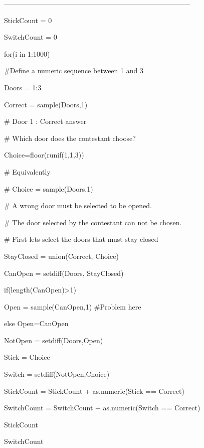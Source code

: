 \documentclass[a4paper,12pt]{article}
\begin{document}
--------------------------------------------------------------------------------





StickCount = 0

SwitchCount = 0


for(i in 1:1000)


{
	
	
	
	#Define a numeric sequence between 1 and 3
	
	
	Doors = 1:3 
	
	
	
	Correct = sample(Doors,1)
	
	
	
	
	
	# Door 1 :  Correct answer
	
	
	
	# Which door does the contestant choose?
	
	
	Choice=floor(runif(1,1,3))
	
	
	# Equivalently
	
	# Choice = sample(Doors,1)
	
	
	
	# A wrong door must be selected to be opened. 
	
	# The door selected by the contestant can not be chosen.
	
	# First lets select the doors that must stay closed 
	
	
	StayClosed = union(Correct, Choice)
	
	
	
	CanOpen = setdiff(Doors, StayClosed)
	
	
	
	
	
	if(length(CanOpen)>1)
	
	{
		
		Open = sample(CanOpen,1) #Problem here
		
	}else {Open=CanOpen}
	
	
	NotOpen = setdiff(Doors,Open)
	
	
	Stick = Choice
	
	
	Switch = setdiff(NotOpen,Choice)
	
	
	
	
	StickCount = StickCount + as.numeric(Stick  ==  Correct)
	
	SwitchCount = SwitchCount + as.numeric(Switch  ==  Correct)
	
	
}



StickCount

SwitchCount
\end{document}
